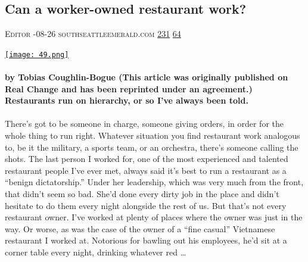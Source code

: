 \documentclass[10pt,a4paper]{article}
\begin{document}
\begin{multicols}{2}
\begin{minipage}{\linewidth}
\subsection{Can a worker-owned restaurant work?}
\textsc{\footnotesize
{\scriptsize\faUser}\space 
Editor 
{\scriptsize\faCalendar}-08-26 
{\scriptsize\faGlobe}\space 
southseattleemerald.com 
{\scriptsize\faThumbsOUp}\space 
\href{http://news.ycombinator.com/item?id=37279895\&utm\_term=comment}{231} 
{\scriptsize\faComments}\space 
\href{http://news.ycombinator.com/item?id=37279895\&utm\_term=comment}{64} 
}
\par\medskip\noindent
\href{https://southseattleemerald.com/2023/08/26/can-a-worker-owned-restaurant-work/?utm\_source=hackernewsletter\&utm\_medium=email\&utm\_term=working}{
    \texttt{[image: 49.png]}
}
\end{minipage}
\paragraph{}
\textbf{by Tobias Coughlin-Bogue
(This article was originally published on Real Change and has been reprinted under an agreement.)
Restaurants run on hierarchy, or so I’ve always been told.}
\paragraph{}
 There’s got to be someone in charge, someone giving orders, in order for the whole thing to run right. Whatever situation you find restaurant work analogous to, be it the military, a sports team, or an orchestra, there’s someone calling the shots.
The last person I worked for, one of the most experienced and talented restaurant people I’ve ever met, always said it’s best to run a restaurant as a “benign dictatorship.” Under her leadership, which was very much from the front, that didn’t seem so bad. She’d done every dirty job in the place and didn’t hesitate to do them every night alongside the rest of us.
But that’s not every restaurant owner.
I’ve worked at plenty of places where the owner was just in the way. Or worse, as was the case of the owner of a “fine casual” Vietnamese restaurant I worked at. Notorious for bawling out his employees, he’d sit at a corner table every night, drinking whatever red 
\dots\par
\noindent\begin{minipage}{\linewidth}
\medskip

\end{minipage}
\end{multicols}
\end{document}
